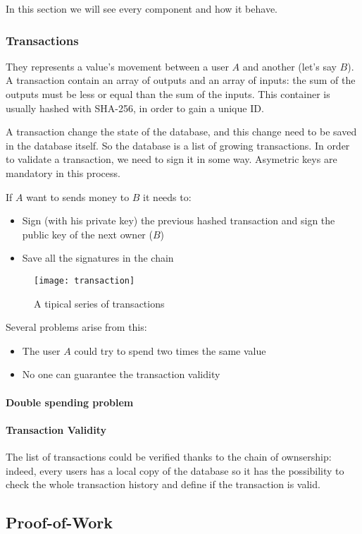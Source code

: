In this section we will see every component and how it behave.

\subsubsection{Transactions}
They represents a value's movement between a user $A$ and another (let's
say $B$). A transaction contain an array of outputs and an array of
inputs\cite{sok15}: the sum of the outputs must be less or equal than the sum of
the inputs. This container is usually hashed with SHA-256, in order to gain a
unique ID.

A transaction change the state of the database, and this change need to be saved
in the database itself. So the database is a list of growing transactions.
In order to validate a transaction, we need to sign it in some way. Asymetric
keys are mandatory in this process.

If $A$ want to sends money to $B$ it needs to:
\begin{itemize}
 \item Sign (with his private key) the previous hashed transaction and sign the
public key of the next owner ($B$)
 \item Save all the signatures in the chain
\end{itemize}

\begin{figure}[h]
 \centering
 \texttt{[image: transaction]}
 \caption{A tipical series of transactions}
\end{figure}

Several problems arise from this:
\begin{itemize}
 \item The user $A$ could try to spend two times the same value
 \item No one can guarantee the transaction validity
\end{itemize}

\paragraph*{Double spending problem}

\paragraph*{Transaction Validity}
The list of transactions could be verified thanks to the chain of ownsership:
indeed, every users has a local copy of the database so it has the possibility
to check the whole transaction history and define if the transaction is valid.

\subsection{Proof-of-Work}

